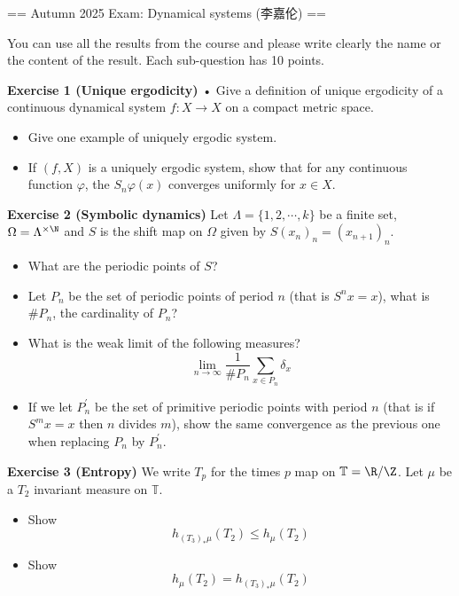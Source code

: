 
== Autumn 2025 Exam: Dynamical systems (李嘉伦) ==

\qquad You can use all the results from the course and please write clearly the name or the content of the result. Each sub-question has 10 points.

\textbf{Exercise 1 (Unique ergodicity)} • Give a definition of unique ergodicity of a continuous dynamical system $f: X \rightarrow X$ on a compact metric space.
\begin{itemize}
\item Give one example of uniquely ergodic system.
\item If $(f, X)$ is a uniquely ergodic system, 
show that for any continuous function $\varphi$, 
the $S_{n} \varphi(x)$ converges uniformly for $x \in X$.
\end{itemize}

\textbf{Exercise 2 (Symbolic dynamics)} Let $\Lambda=\{1,2, \cdots, k\}$ be a finite set, 
$\Omega=\Lambda^{\times \N}$ and $S$ is the shift map on $\Omega$ given by $S(x_{n})_{n}=(x_{n+1})_{n}$.
\begin{itemize}
\item What are the periodic points of $S$?
\item Let $P_{n}$ be the set of periodic points of period $n$ (that is $S^{n} x=x$), what is $\# P_{n}$, the cardinality of $P_{n}$?
\item What is the weak limit of the following measures?
$$\lim_{n \rightarrow \infty} \frac{1}{\# P_{n}} \sum_{x \in P_{n}} \delta_{x}$$
\item If we let $P_{n}^{\prime}$ be the set of primitive periodic points with period $n$ (that is if $S^{m} x=x$ then $n$ divides $m$), 
show the same convergence as the previous one when replacing $P_{n}$ by $P_{n}^{\prime}$.
\end{itemize}

\textbf{Exercise 3 (Entropy)} We write $T_{p}$ for the times $p$ map on $\mathbb{T}=\R/\Z$. 
Let $\mu$ be a $T_{2}$ invariant measure on $\mathbb{T}$.
\begin{itemize}
\item Show
$$h_{(T_{3})_{*} \mu}(T_{2}) \leq h_{\mu}(T_{2})$$
\item Show
$$h_{\mu}(T_{2})=h_{(T_{3})_{*} \mu}(T_{2})$$
\end{itemize}

